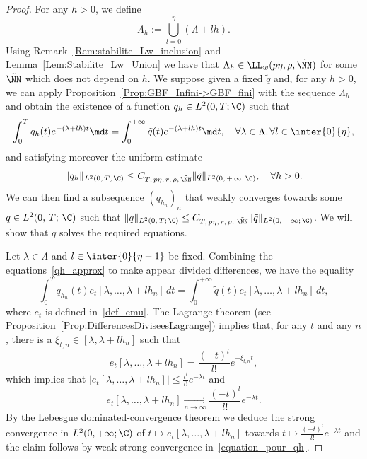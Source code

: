 \begin{proof}
For any $h>0$, we define
\[
\Lambda_h:=\bigcup_{l=0}^{\eta} (\Lambda + l h).
\]
Using Remark~\ref{Rem:stabilite_Lw_inclusion} and Lemma~\ref{Lem:Stabilite_Lw_Union} we have that $\Lambda_h\in \LL_w(p\eta, \rho, \tilde{\NN})$ for some $\tilde{\NN}$ which does not depend on $h$. We suppose given a fixed $\tilde{q}$ and, for any $h>0$, we can apply Proposition~\ref{Prop:GBF_Infini->GBF_fini} with the sequence $\Lambda_h$ and obtain the existence of a function $q_h\in L^2(0,T;\C)$ such that
\begin{equation}\label{qh_approx}
\int_0^T q_h(t) e^{-(\lambda + lh) t} \md t = \int_0^{+\infty} \tilde{q}(t) e^{-(\lambda + lh) t} \md t, \quad\forall \lambda\in \Lambda, \forall l\in \inter{0}{\eta},
\end{equation}
and satisfying moreover the uniform estimate
\[
\|q_h\|_{L^2(0,\,T;\,\C)} \leq C_{T,\,p\eta,\,r,\,\rho, \,\tilde{\NN}} \|\tilde{q}\|_{L^2(0,\,+\,\infty;\,\C)}, \quad \forall h>0.
\]
We can then find a subsequence $(q_{h_n})_n$ that weakly converges towards some $q\in L^2(0,\,T;\,\C)$ such that $\|q\|_{L^2(0,\,T;\,\C)} \leq C_{T,\,p\eta,\,r,\,\rho,\, \,\tilde{\NN}} \|\tilde{q}\|_{L^2(0,\,+\,\infty;\,\C)}$. We will show that $q$ solves the required equations.

Let $\lambda\in \Lambda$ and $l\in \inter{0}{\eta-1}$ be fixed. Combining the equations~\eqref{qh_approx} to make appear divided differences, we have the equality
\begin{equation}\label{equation_pour_qh}
\int_0^{T} q_{h_n}(t) e_t[\lambda,\dotsc,\lambda+lh_n] \, dt = \int_0^{+\infty} \tilde{q}(t) e_t[\lambda,\dotsc,\lambda+l h_n] \, dt,
\end{equation}
where $e_t$ is defined in~\eqref{def_emu}. The Lagrange theorem (see Proposition~\ref{Prop:DifferencesDiviseesLagrange}) implies that, for any $t$ and any $n$, there is a $\xi_{t,n}\in [\lambda,\lambda+lh_n]$ such that
\[
e_t[\lambda,\dotsc,\lambda+lh_n] = \frac{(-t)^l}{l!} e^{-\xi_{t,n} t},
\]
which implies that $| e_t[\lambda,\dotsc,\lambda+lh_n]|\leq \frac{t^l}{l!} e^{-\lambda t}$ and
\[
e_t[\lambda,\dotsc,\lambda+lh_n]\xrightarrow[n\to \infty]{} \frac{(-t)^l}{l!} e^{-\lambda t}.
\]
By the Lebesgue dominated-convergence theorem we deduce the strong convergence in $L^2(0,+\infty;\C)$ of $t\mapsto e_t[\lambda,\dotsc,\lambda+lh_n]$ towards $t\mapsto \frac{(-t)^l}{l!} e^{-\lambda t}$ and the claim follows by weak-strong convergence in~\eqref{equation_pour_qh}.
\end{proof}



